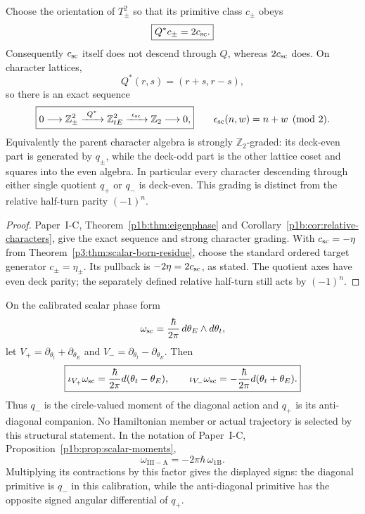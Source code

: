 \documentclass[12pt,a4paper]{article}
\begin{document}
\begin{corollary}
\label{p3a:cor:v190-scalar-deck-grading}
Choose the orientation of $T^2_\pm$ so that its primitive class $c_\pm$ obeys
\[
 \boxed{Q^*c_\pm=2c_{\rm sc}.}
\]
Consequently $c_{\rm sc}$ itself does not descend through $Q$, whereas
$2c_{\rm sc}$ does.  On character lattices,
\[
 Q^*(r,s)=(r+s,r-s),
\]
so there is an exact sequence
\[
 \boxed{0\longrightarrow\mathbb Z^2_{\pm}
 \xrightarrow{\ Q^*\ }\mathbb Z^2_{tE}
 \xrightarrow{\ \epsilon_{\rm sc}\ }\mathbb Z_2\longrightarrow0,}
 \qquad \epsilon_{\rm sc}(n,w)=n+w\pmod2.
\]
Equivalently the parent character algebra is strongly $\mathbb Z_2$-graded:
its deck-even part is generated by $q_\pm$, while the deck-odd part is the
other lattice coset and squares into the even algebra.  In particular every
character descending through either single quotient $q_+$ or $q_-$ is
deck-even.  This grading is distinct from the relative half-turn parity
$(-1)^n$.
\end{corollary}

\begin{proof}
Paper~I-C, Theorem~\ref{p1b:thm:eigenphase} and
Corollary~\ref{p1b:cor:relative-characters}, give the exact sequence and
strong character grading. With $c_{\rm sc}=-\eta$ from
Theorem~\ref{p3:thm:scalar-born-residue}, choose the standard ordered
target generator $c_\pm=\eta_\pm$. Its pullback is
$-2\eta=2c_{\rm sc}$, as stated. The quotient axes have even deck parity;
the separately defined relative half-turn still acts by $(-1)^n$.
\end{proof}

\begin{corollary}
\label{p3a:cor:v190-scalar-mutual-moments}
On the calibrated scalar phase form
\[
 \omega_{\rm sc}=\frac{\hbar}{2\pi}\,d\theta_E\wedge d\theta_t,
\]
let $V_+=\partial_{\theta_t}+\partial_{\theta_E}$ and
$V_-=\partial_{\theta_t}-\partial_{\theta_E}$.  Then
\[
 \boxed{\iota_{V_+}\omega_{\rm sc}
 =\frac{\hbar}{2\pi}d(\theta_t-\theta_E),\qquad
 \iota_{V_-}\omega_{\rm sc}
 =-\frac{\hbar}{2\pi}d(\theta_t+\theta_E).}
\]
Thus $q_-$ is the circle-valued moment of the diagonal action and $q_+$ is
its anti-diagonal companion.  No Hamiltonian member or actual trajectory is
selected by this structural statement.
In the notation of Paper~I-C, Proposition~\ref{p1b:prop:scalar-moments},
\[
 \omega_{\mathrm{III-A}}=-2\pi\hbar\,\omega_{\mathrm{1B}}.
\]
Multiplying its contractions by this factor gives the displayed signs:
the diagonal primitive is $q_-$ in this calibration, while the
anti-diagonal primitive has the opposite signed angular differential of
$q_+$.
\end{corollary}
\end{document}

